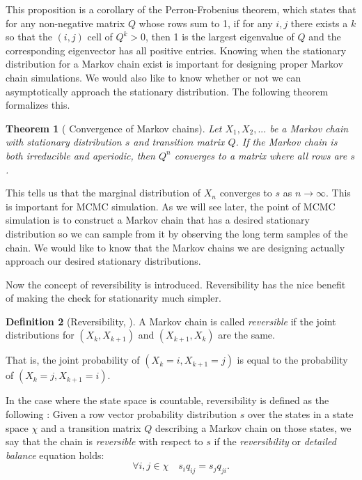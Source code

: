 \documentclass[11pt]{amsart}
\theoremstyle{theorem} %
\newtheorem{thm}{Theorem}[section] %
\theoremstyle{definition}                  %
\newtheorem{defn}[thm]{Definition}
\theoremstyle{example}                       %
\theoremstyle{remark}                       %
\numberwithin{equation}{section}
\begin{document}
This proposition is a corollary of the Perron-Frobenius theorem, which states that for any non-negative matrix $Q$ whose rows sum to 1, if for any $i,j$ there exists a $k$ so that the $(i, j)$ cell of $Q^k>0$, then 1 is the largest eigenvalue of $Q$ and the corresponding eigenvector has all positive entries. Knowing when the stationary distribution for a Markov chain exist is important for designing proper Markov chain simulations. We would also like to know whether or not we can asymptotically approach the stationary distribution. The following theorem formalizes this.

\begin{thm}[{\cite[p.~471]{blitzstein} Convergence of Markov chains}]
    Let $X_1, X_2, ... $ be a Markov chain with stationary distribution $s$ and transition matrix $Q$. If the Markov chain is both irreducible and aperiodic, then $Q^n$ converges to a matrix where all rows are $s$.
\end{thm}

This tells us that the marginal distribution of $X_n$ converges to $s$ as $n \to \infty$. This is important for MCMC simulation. As we will see later, the point of MCMC simulation is to construct a Markov chain that has a desired stationary distribution so we can sample from it by observing the long term samples of the chain. We would like to know that the Markov chains we are designing actually approach our desired stationary distributions.

Now the concept of reversibility is introduced. Reversibility has the nice benefit of making the check for stationarity much simpler.

\begin{defn}[{Reversibility, \cite[p.~6]{mcmc}}]

    A Markov chain is called \emph{reversible} if the joint distributions for $(X_k, X_{k+1})$ and $(X_{k+1}, X_k)$ are the same.
\end{defn}

That is, the joint probability of $(X_k=i, X_{k+1}=j)$ is equal to the probability of $(X_k=j, X_{k+1}=i)$.

In the case where the state space is countable, reversibility is defined as the following \cite[p.~475]{blitzstein}: Given a row vector probability distribution $s$ over the states in a state space $\chi$ and a transition matrix $Q$ describing a Markov chain on those states, we say that the chain is \emph{reversible} with respect to $s$ if the \emph{reversibility} or \emph{detailed balance} equation holds:
    \[\forall i,j \in \chi \quad s_iq_{ij}=s_jq_{ji}.\]
\end{document}
